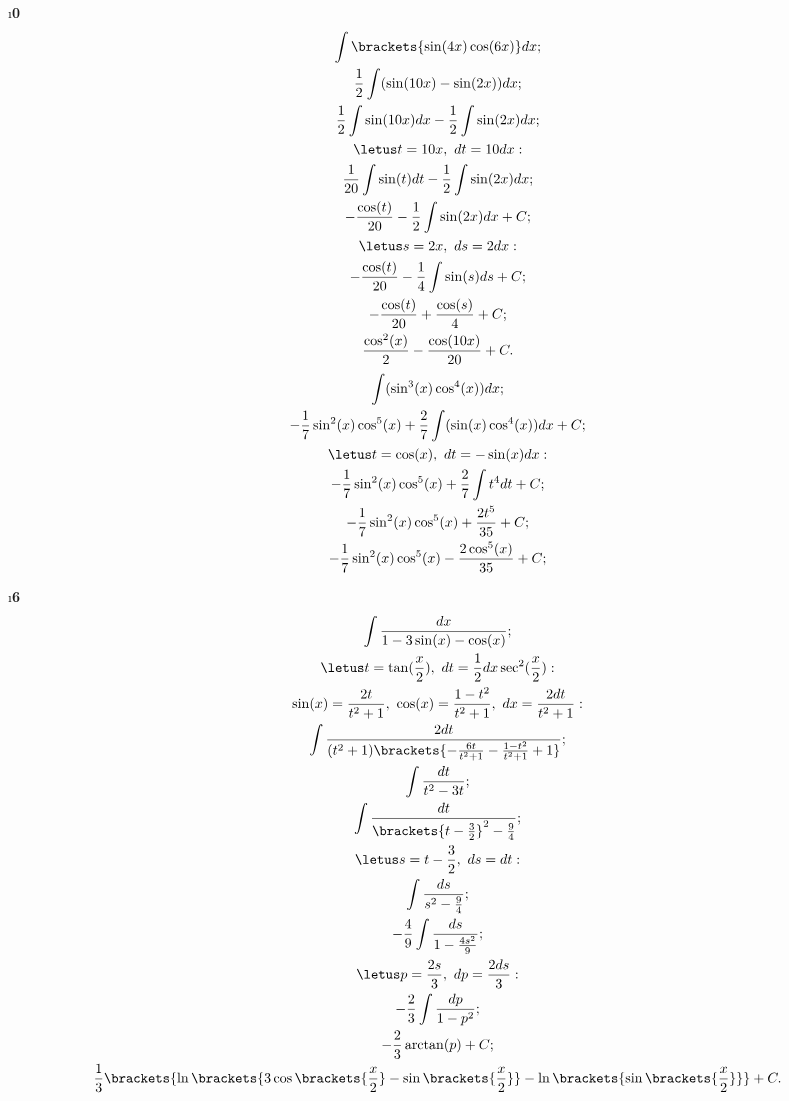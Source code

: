 \newpage
\i \textbf{0}
\pu 
\begin{gather*}
    \int\brackets{\sin(4x)\cos(6x)}dx;\\
    \frac{1}{2}\int(\sin(10x)-\sin(2x))dx;\\
    \frac{1}{2}\int\sin(10x)dx - \frac{1}{2}\int\sin(2x)dx;\\
    \letus t = 10x,\ dt = 10dx:\\
    \frac{1}{20}\int\sin(t)dt - \frac{1}{2}\int\sin(2x)dx;\\
    -\frac{\cos(t)}{20} - \frac{1}{2}\int\sin(2x)dx + C;\\
    \letus s = 2x,\ ds = 2dx:\\
    -\frac{\cos(t)}{20} - \frac{1}{4}\int\sin(s)ds + C;\\
    -\frac{\cos(t)}{20} + \frac{\cos(s)}{4} + C;\\
    \frac{\cos^2(x)}{2} - \frac{\cos(10x)}{20} + C.
\end{gather*}
\pu
\begin{gather*}
    \int(\sin^3(x)\cos^4(x))dx;\\
    -\frac{1}{7}\sin^2(x)\cos^5(x) + \frac{2}{7}\int(\sin(x)\cos^4(x))dx + C;\\
    \letus t = \cos(x),\ dt = -\sin(x)dx:\\
    -\frac{1}{7}\sin^2(x)\cos^5(x) + \frac{2}{7}\int t^4dt + C;\\
    -\frac{1}{7}\sin^2(x)\cos^5(x) + \frac{2t^5}{35} + C;\\
    -\frac{1}{7}\sin^2(x)\cos^5(x) - \frac{2\cos^5(x)}{35} + C;\\
\end{gather*}

\newpage
\i \textbf{6}
\begin{gather*}
    \int\frac{dx}{1 - 3\sin(x) - \cos(x)};\\
    \letus t = \tan(\frac{x}{2}),\ dt = \frac{1}{2}dx\sec^2(\frac{x}{2}):\\
    \sin(x) = \frac{2t}{t^2+1},\ \cos(x) = \frac{1-t^2}{t^2+1},\ dx = \frac{2dt}{t^2+1}:\\
    \int\frac{2dt}{(t^2+1)\brackets{-\frac{6t}{t^2+1} - \frac{1-t^2}{t^2+1} + 1}};\\
    \int\frac{dt}{t^2-3t};\\
    \int\frac{dt}{\brackets{t-\frac{3}{2}}^2 -\frac{9}{4}};\\
    \letus s = t-\frac{3}{2},\ ds = dt:\\
    \int\frac{ds}{s^2-\frac{9}{4}};\\
    -\frac{4}{9}\int\frac{ds}{1-\frac{4s^2}{9}};\\
    \letus p = \frac{2s}{3},\ dp = \frac{2ds}{3}:\\
    -\frac{2}{3}\int\frac{dp}{1-p^2};\\
    -\frac{2}{3}\arctan(p) + C;\\
    \frac{1}{3}\brackets{\ln\brackets{3\cos\brackets{\frac{x}{2}} -\sin\brackets{\frac{x}{2}}} - \ln\brackets{\sin\brackets{\frac{x}{2}}}} + C.
\end{gather*}

